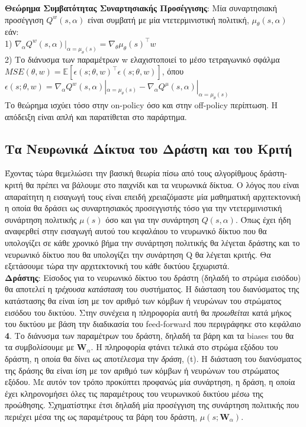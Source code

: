 \documentclass[11pt]{article} %
\numberwithin{equation}{subsection}
\begin{document}
\textbf{Θεώρημα Συμβατότητας Συναρτησιακής Προσέγγισης}: Μία συναρτησιακή προσέγγιση $Q^{w}(s,\alpha)$ είναι συμβατή με μία ντετερμινιστική πολιτική, $\mu_{\theta}(s,\alpha)$ εάν:\\

1) $\nabla_{\alpha} Q^{w}(s,\alpha)|_{\alpha = \mu_{\theta}(s)} = \nabla_{\theta} \mu_{\theta}(s) ^ \intercal w$\\

2) Το διάνυσμα των παραμέτρων w ελαχιστοποιεί το μέσο τετραγωνικό σφάλμα $MSE(\theta, w) = \mathbb{E}\left[\epsilon(s;\theta,w)^\intercal \epsilon(s;\theta, w)\right]$, όπου $\epsilon(s;\theta,w) = \nabla_{\alpha}Q^{w}(s,\alpha)|_{\alpha = \mu_{\theta}(s)} - \nabla_{\alpha}Q^{\mu}(s,\alpha)|_{\alpha = \mu_{\theta}(s)}$\\

Το θεώρημα ισχύει τόσο στην on-policy όσο και στην off-policy περίπτωση. Η απόδειξη είναι απλή και παρατίθεται στο παράρτημα.\\


\subsection{Τα Νευρωνικά Δίκτυα του Δράστη και του Κριτή}
Έχοντας τώρα θεμελιώσει την βασική θεωρία πίσω από τους αλγορίθμους δράστη-κριτή θα πρέπει να βάλουμε στο παιχνίδι και τα νευρωνικά δίκτυα. Ο λόγος που είναι απαραίτητη η εισαγωγή τους είναι επειδή χρειαζόμαστε μία μαθηματική αρχιτεκτονική η οποία θα δράσει ως συναρτησιακός προσεγγιστής τόσο για την ντετερμινιστική συνάρτηση πολιτικής $\mu(s)$ όσο και για την συνάρτηση $Q(s,\alpha)$. Όπως έχει ήδη αναφερθεί στην εισαγωγή αυτού του κεφαλάιου το νευρωνικό δίκτυο που θα υπολογίζει σε κάθε χρονικό βήμα την συνάρτηση πολιτικής θα λέγεται δράστης και το νευρωνικό δίκτυο που θα υπολογίζει την συνάρτηση Q θα λέγεται κριτής. Θα εξετάσουμε τώρα την αρχιτεκτονική του κάθε δικτύου ξεχωριστά.\\

\textbf{Δράστης}: Είσοδος για το νευρωνικό δίκτυο του δράστη (δηλαδή το στρώμα εισόδου) θα αποτελεί η \textit{τρέχουσα κατάσταση} του συστήματος. Η διάσταση του διανύσματος της κατάστασης θα είναι ίση με τον αριθμό των κόμβων ή νευρώνων του στρώματος εισόδου του δικτύου. Στην συνέχεια η πληροφορία αυτή θα \textit{προωθείται} κατά μήκος του δικτύου με βάση την διαδικασία του feed-forward που περιγράφηκε στο κεφάλαιο \textbf{4}. Το διάνυσμα των παραμέτρων του δράστη, δηλαδή τα βάρη και τα biases του θα τα συμβολίσουμε με $\textbf{W}_{α}$. Η πληροφορία φτάνει τελικά στο στρώμα εξόδου του δράστη, η οποία θα δίνει ως αποτέλεσμα την \textit{δράση}, \alpha(t). Η διάσταση του διανύσματος της δράσης θα είναι ίση με τον αριθμό των κόμβων ή νευρώνων του στρώματος εξόδου. Με αυτόν τον τρόπο προκύπτει προφανώς μία συνάρτηση, η δράση, η οποία έχει κληρονομήσει όλες τις παραμέτρους του νευρωνικού δικτύου μέσω της προώθησης. Σχηματίστηκε έτσι δηλαδή μία προσέγγιση της συνάρτηση πολιτικής που περιέχει μέσα της ως παραμέτρους τα βάρη του δράστη, $\mu(s; \textbf{W}_{α})$.\\
\end{document}

